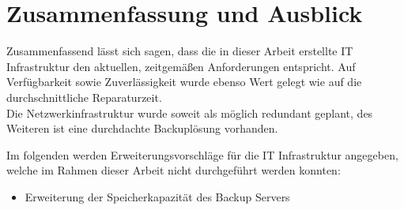 \chapter{Zusammenfassung und Ausblick}

\thispagestyle{standard}
\pagestyle{standard}

Zusammenfassend lässt sich sagen, dass die in dieser Arbeit erstellte IT Infrastruktur den aktuellen, zeitgemäßen Anforderungen entspricht. Auf Verfügbarkeit sowie Zuverlässigkeit wurde ebenso Wert gelegt wie auf die durchschnittliche Reparaturzeit. \\
Die Netzwerkinfrastruktur wurde soweit als möglich redundant geplant, des Weiteren ist eine durchdachte Backuplösung vorhanden. 

Im folgenden werden Erweiterungsvorschläge für die IT Infrastruktur angegeben, welche im Rahmen dieser Arbeit nicht durchgeführt werden konnten:

\begin{itemize}[noitemsep]
\item Erweiterung der Speicherkapazität des Backup Servers
\end{itemize}